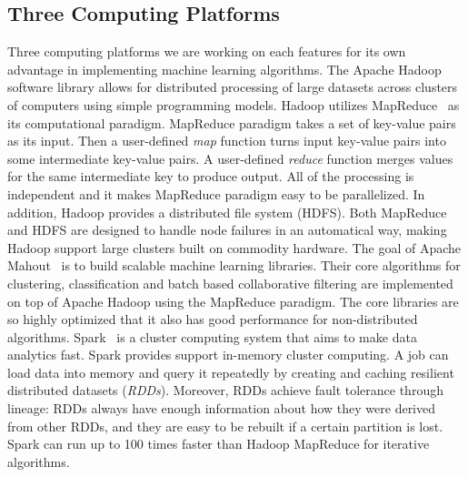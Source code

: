 \documentclass[10pt, conference, compsocconf]{IEEEtran}
\begin{document}
\subsection{Three Computing Platforms}
Three computing platforms we are working on each features for its own advantage in implementing machine learning algorithms.
The Apache Hadoop~\cite{white2012hadoop} software library allows for distributed processing of large datasets across clusters of computers using simple programming models.
Hadoop utilizes MapReduce~\cite{dean2008mapreduce} as its computational paradigm.
MapReduce paradigm takes a set of key-value pairs as its input.
Then a user-defined \textit{map} function turns input key-value pairs into some intermediate key-value pairs.
A user-defined \textit{reduce} function merges values for the same intermediate key to produce output.
All of the processing is independent and it makes MapReduce paradigm easy to be parallelized.
In addition, Hadoop provides a distributed file system (HDFS).
Both MapReduce and HDFS are designed to handle node failures in an automatical way, making Hadoop support large clusters built on commodity hardware.
The goal of Apache Mahout~\cite{mahoutscalable} is to build scalable machine learning libraries. Their core algorithms for clustering, classification and batch based collaborative filtering are implemented on top of Apache Hadoop using the MapReduce paradigm. The core libraries are so highly optimized that it also has good performance for non-distributed algorithms.
Spark~\cite{zaharia2010spark} is a cluster computing system that aims to make data analytics fast.
Spark provides support in-memory cluster computing. A job can load data into memory and query it repeatedly by creating and caching resilient distributed datasets (\textit{RDDs}).
Moreover, RDDs achieve fault tolerance through lineage: RDDs always have enough information about how they were derived from other RDDs, and they are easy to be rebuilt if a certain partition is lost.
Spark can run up to 100 times faster than Hadoop MapReduce for iterative algorithms.
\end{document}
